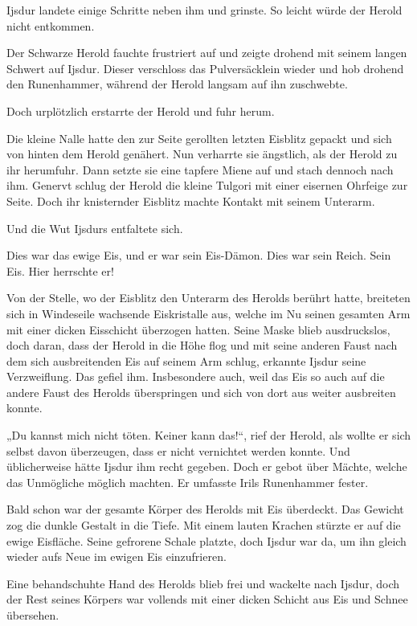 Ijsdur landete einige Schritte neben ihm und grinste. So leicht würde der Herold nicht entkommen.

Der Schwarze Herold fauchte frustriert auf und zeigte drohend mit seinem langen Schwert auf Ijsdur. Dieser verschloss das Pulversäcklein wieder und hob drohend den Runenhammer, während der Herold langsam auf ihn zuschwebte.

Doch urplötzlich erstarrte der Herold und fuhr herum.

Die kleine Nalle hatte den zur Seite gerollten letzten Eisblitz gepackt und sich von hinten dem Herold genähert. Nun verharrte sie ängstlich, als der Herold zu ihr herumfuhr. Dann setzte sie eine tapfere Miene auf und stach dennoch nach ihm. Genervt schlug der Herold die kleine Tulgori mit einer eisernen Ohrfeige zur Seite. Doch ihr knisternder Eisblitz machte Kontakt mit seinem Unterarm.

Und die Wut Ijsdurs entfaltete sich.

Dies war das ewige Eis, und er war sein Eis-Dämon. Dies war sein Reich. Sein Eis. Hier herrschte er!

Von der Stelle, wo der Eisblitz den Unterarm des Herolds berührt hatte, breiteten sich in Windeseile wachsende Eiskristalle aus, welche im Nu seinen gesamten Arm mit einer dicken Eisschicht überzogen hatten. Seine Maske blieb ausdruckslos, doch daran, dass der Herold in die Höhe flog und mit seine anderen Faust nach dem sich ausbreitenden Eis auf seinem Arm schlug, erkannte Ijsdur seine Verzweiflung. Das gefiel ihm. Insbesondere auch, weil das Eis so auch auf die andere Faust des Herolds überspringen und sich von dort aus weiter ausbreiten konnte.

„Du kannst mich nicht töten. Keiner kann das!“, rief der Herold, als wollte er sich selbst davon überzeugen, dass er nicht vernichtet werden konnte. Und üblicherweise hätte Ijsdur ihm recht gegeben. Doch er gebot über Mächte, welche das Unmögliche möglich machten. Er umfasste Irils Runenhammer fester.

Bald schon war der gesamte Körper des Herolds mit Eis überdeckt. Das Gewicht zog die dunkle Gestalt in die Tiefe. Mit einem lauten Krachen stürzte er auf die ewige Eisfläche. Seine gefrorene Schale platzte, doch Ijsdur war da, um ihn gleich wieder aufs Neue im ewigen Eis einzufrieren.

Eine behandschuhte Hand des Herolds blieb frei und wackelte nach Ijsdur, doch der Rest seines Körpers war vollends mit einer dicken Schicht aus Eis und Schnee übersehen.

